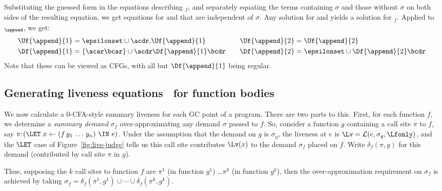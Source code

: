 Substituting  the  guessed   form  in  the  equations  describing
\Lfonly$_{\mathit   f}$,  and   separately  equating   the  terms
containing $\sigma$ and those  without $\sigma$ on both sides of the
resulting equation, we
get equations for  and  that are independent of
$\sigma$.  Any solution for    and   yields  a
solution for  \Lfonly$_{\mathit f}$. Applied  to \Lfonly$_{\mathit
  \append}$, we get:
  \begin{align*}
    \Uf{\append}{1} &= \epsilonset
    \cup \acdr.\Uf{\append}{1}  
    &\quad 
    \Uf{\append}{2} &= \Uf{\append}{2} \\
    \Df{\append}{1} &= \lbrace\acar\bcar\rbrace 
    \cup \acdr\Df{\append}{1}\bcdr &\quad 
    \Df{\append}{2} &= \epsilonset \cup
    \Df{\append}{2}\bcdr 
  \end{align*}
Note that these can be viewed as CFGs, with all but $\Df{\append}{1}$ being regular.

\subsection{Generating liveness equations \Lv\  for function bodies}
\label{sec:bodylivenessbodies}

\newcommand{\deltacall}[3]{\delta_{#1}({#2},{#3})}

We now calculate a 0-CFA-style summary liveness for each GC point of a program.
There are two parts to this.
First, for each function $f$,  we determine a {\em summary demand} $\sigma_f$
over-approximating any demand $\sigma$ passed to $f$.
So, consider a function $g$ containing a call site $\pi$ to $f$, say
$\pi\!\!:\!(\LET~x \leftarrow (f\,y_1\,\ldots\,y_n)~\IN~e)$.
Under the assumption that the demand on $g$ is $\sigma_g$, the liveness at $e$
is $\Lv = \mathcal{L}(e,\sigma_g,\Lfonly)$, and the $\LET$ case of
Figure~\ref{fig:live-judge} tells us this call site contributes $\Lv(x)$ to the
demand $\sigma_f$ placed on  $f$.
Write $\deltacall{f}{\pi}{g}$ for
this demand (contributed by call site $\pi$ in $g$).

Thus, supposing the $k$ call sites to function $f$ are
$\pi^1$ (in function $g^1$) \ldots $\pi^k$ (in function $g^k$),
then the over-approximation requirement on $\sigma_f$
is achieved by taking $\sigma_f = \deltacall{f}{\pi^1}{g^1} \cup \cdots \cup \deltacall{f}{\pi^k}{g^k}$.

